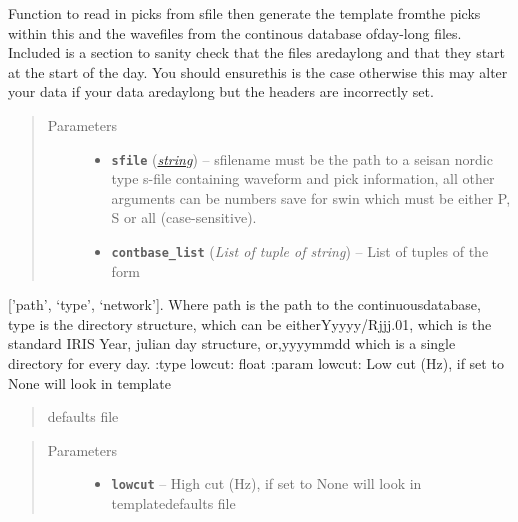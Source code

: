 \documentclass[a4paper,10pt,english]{sphinxmanual}
\begin{document}
\begin{fulllineitems}
\label{submodules/core.template_gen:template_gen.from_contbase}
Function to read in picks from sfile then generate the template fromthe picks within this and the wavefiles from the continous database ofday-long files.  Included is a section to sanity check that the files aredaylong and that they start at the start of the day.  You should ensurethis is the case otherwise this may alter your data if your data aredaylong but the headers are incorrectly set.
\begin{quote}\begin{description}
\item[{Parameters}] \leavevmode\begin{itemize}
\item {} 
\textbf{\texttt{sfile}} (\href{https://docs.python.org/library/string.html\#module-string}{\emph{string}}) -- sfilename must be the path to a seisan nordic type s-file containing waveform and pick information, all other arguments can be numbers save for swin which must be either P, S or all (case-sensitive).

\item {} 
\textbf{\texttt{contbase\_list}} (\emph{List of tuple of string}) -- List of tuples of the form

\end{itemize}

\end{description}\end{quote}

{[}'path', `type', `network'{]}.  Where path is the path to the continuousdatabase, type is the directory structure, which can be eitherYyyyy/Rjjj.01, which is the standard IRIS Year, julian day structure, or,yyyymmdd which is a single directory for every day.
:type lowcut: float
:param lowcut: Low cut (Hz), if set to None will look in template
\begin{quote}

defaults file
\end{quote}
\begin{quote}\begin{description}
\item[{Parameters}] \leavevmode\begin{itemize}
\item {} 
\textbf{\texttt{lowcut}} -- High cut (Hz), if set to None will look in templatedefaults file


\end{itemize}
\end{description}
\end{quote}
\end{fulllineitems}
\end{document}
